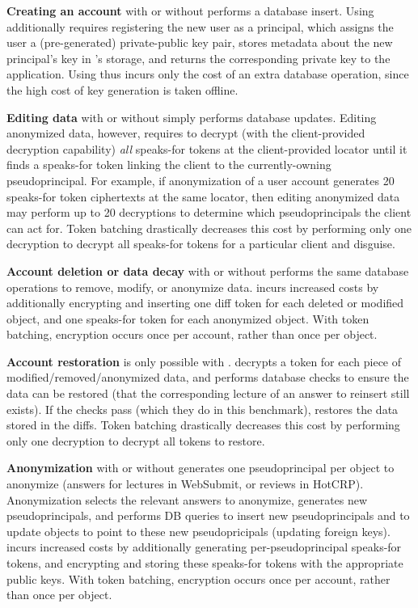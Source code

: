 \textbf{Creating an account} with or without \sys performs a database insert. Using \sys additionally
requires registering the new user as a principal, which assigns the user a (pre-generated)
private-public key pair, stores metadata about the new principal's key in \sys's storage, and
returns the corresponding private key to the application.
Using \sys thus incurs only the cost of an extra database operation, since the high cost of key
generation is taken offline.

\textbf{Editing data} with or without \sys simply performs database updates. Editing anonymized
data, however, requires \sys to decrypt (with the client-provided decryption capability) \emph{all}
speaks-for tokens at the client-provided locator until it finds a speaks-for token linking the
client to the currently-owning pseudoprincipal.  For example, if anonymization of a user account
generates 20 speaks-for token ciphertexts at the same locator, then editing anonymized data may
perform up to 20 decryptions to determine which pseudoprincipals the client can act for.  Token
batching drastically decreases this cost by performing only one decryption to decrypt all speaks-for
tokens for a particular client and disguise.

\textbf{Account deletion or data decay} with or without \sys performs the same database operations
to remove, modify, or anonymize data. \sys incurs increased costs by additionally encrypting and
inserting one diff token for each deleted or modified object, and one speaks-for token for each
anonymized object.  With token batching, encryption occurs once per account, rather than once per
object. 

\textbf{Account restoration} is only possible with \sys. \sys decrypts a token for each
piece of modified/removed/anonymized data, and performs database checks to ensure the data can be restored
(\eg that the corresponding lecture of an answer to reinsert still exists). If the checks pass
(which they do in this benchmark), \sys restores the data stored in the diffs. 
Token batching drastically decreases this cost by performing only one decryption to decrypt all 
tokens to restore.

\textbf{Anonymization} with or without \sys generates one pseudoprincipal per object to anonymize
(\eg answers for lectures in WebSubmit, or reviews in HotCRP). Anonymization selects the relevant answers
to anonymize, generates new pseudoprincipals, and performs DB queries to insert new pseudoprincipals
and to update objects to point to these new pseudopricipals (\eg updating foreign keys).
\sys incurs increased costs by additionally generating per-pseudoprincipal speaks-for tokens, and 
encrypting and storing these speaks-for tokens with the appropriate public keys.
With token batching, encryption occurs once per account, rather than once per object. 

